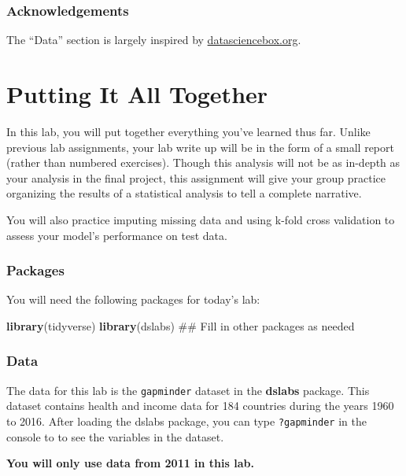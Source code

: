 \documentclass[]{book}
\newenvironment{Shaded}{\begin{snugshade}}{\end{snugshade}}
\newcommand{\KeywordTok}[1]{\textcolor[rgb]{0.13,0.29,0.53}{\textbf{#1}}}
\newcommand{\NormalTok}[1]{#1}
\begin{document}
\subsection{Acknowledgements}\label{acknowledgements-1}

The ``Data'' section is largely inspired by
\href{https://datasciencebox.org/}{datasciencebox.org}.

\chapter{Putting It All Together}\label{together}

In this lab, you will put together everything you've learned thus far.
Unlike previous lab assignments, your lab write up will be in the form
of a small report (rather than numbered exercises). Though this analysis
will not be as in-depth as your analysis in the final project, this
assignment will give your group practice organizing the results of a
statistical analysis to tell a complete narrative.

You will also practice imputing missing data and using k-fold cross
validation to assess your model's performance on test data.

\subsection{Packages}\label{packages-8}

You will need the following packages for today's lab:

\begin{Shaded}
\begin{Highlighting}[]
\KeywordTok{library}\NormalTok{(tidyverse)}
\KeywordTok{library}\NormalTok{(dslabs)}
\NormalTok{## Fill in other packages as needed}
\end{Highlighting}
\end{Shaded}

\subsection{Data}\label{data-8}

The data for this lab is the \texttt{gapminder} dataset in the
\textbf{dslabs} package. This dataset contains health and income data
for 184 countries during the years 1960 to 2016. After loading the
dslabs package, you can type \texttt{?gapminder} in the console to to
see the variables in the dataset.

\textbf{You will only use data from 2011 in this lab.}
\end{document}
